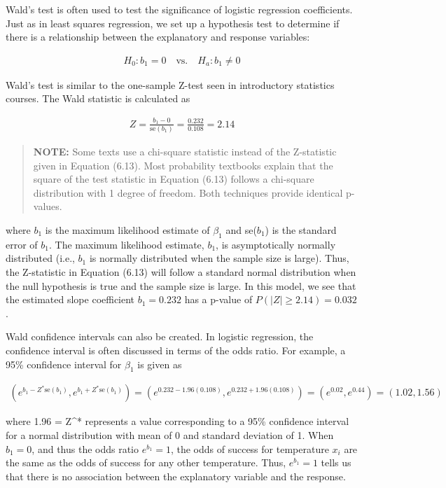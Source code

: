 \documentclass[
]{book}
\begin{document}
Wald's test is often used to test the significance of logistic regression coefficients. Just as in least squares regression, we set up a hypothesis test to determine if there is a relationship between the explanatory and response variables:

\begin{align}
H_0: b_1 = 0 \quad \text{vs.}\quad H_a: b_1 \neq 0
\end{align}

Wald's test is similar to the one-sample Z-test seen in introductory statistics courses. The Wald statistic is calculated as

\begin{align}
Z = \frac{b_1 - 0}{\text{se}(b_1)} = \frac{0.232}{0.108} = 2.14 \tag{6.13}
\end{align}

\begin{quote}
\textbf{NOTE:}
Some texts use a chi-square statistic instead of the Z-statistic given in Equation (6.13). Most probability textbooks explain that the square of the test statistic in Equation (6.13) follows a chi-square distribution with 1 degree of freedom. Both techniques provide identical p-values.
\end{quote}

where \(b_1\) is the maximum likelihood estimate of \(\beta_1\) and se(\(b_1\)) is the standard error of \(b_1\). The maximum likelihood estimate, \(b_1\), is asymptotically normally distributed (i.e., \(b_1\) is normally distributed when the sample size is large). Thus, the Z-statistic in Equation (6.13) will follow a standard normal distribution when the null hypothesis is true and the sample size is large. In this model, we see that the estimated slope coefficient \(b_1 = 0.232\) has a p-value of \(P(|Z| \geq 2.14) = 0.032\).

Wald confidence intervals can also be created. In logistic regression, the confidence interval is often discussed in terms of the odds ratio. For example, a 95\% confidence interval for \(\beta_1\) is given as

\begin{align}
(e^{b_1 - Z^* \text{se}(b_1)}, e^{b_1 + Z^* \text{se}(b_1)}) = (e^{0.232 - 1.96(0.108)}, e^{0.232 + 1.96(0.108)}) = (e^{0.02}, e^{0.44}) = (1.02, 1.56) \tag{6.14}
\end{align}

where 1.96 = Z\^{}* represents a value corresponding to a 95\% confidence interval for a normal distribution with mean of 0 and standard deviation of 1. When \(b_1 = 0\), and thus the odds ratio \(e^{b_1} = 1\), the odds of success for temperature \(x_i\) are the same as the odds of success for any other temperature. Thus, \(e^{b_1} = 1\) tells us that there is no association between the explanatory variable and the response.
\end{document}
